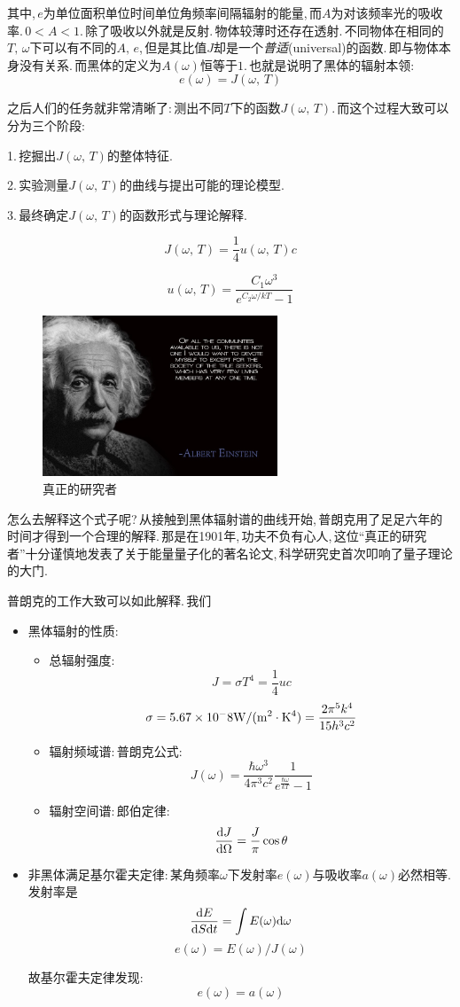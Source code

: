其中,\,$e$为单位面积单位时间单位角频率间隔辐射的能量,\,而$A$为对该频率光的吸收率.\,$0<A<1$.\,除了吸收以外就是反射.\,物体较薄时还存在透射.\,不同物体在相同的$T,\,\omega$下可以有不同的$A,\,e$,\,但是其比值$J$却是一个\emph{普适}(universal)的函数.\,即与物体本身没有关系.\,而黑体的定义为$A(\omega)$恒等于$1$.\,也就是说明了黑体的辐射本领:
\[e(\omega)=J(\omega,\,T)\]

之后人们的任务就非常清晰了:\,测出不同$T$下的函数$J(\omega,\,T)$.\,而这个过程大致可以分为三个阶段:

1.\,挖掘出$J(\omega,\,T)$的整体特征.

2.\,实验测量$J(\omega,\,T)$的曲线与提出可能的理论模型.

3.\,最终确定$J(\omega,\,T)$的函数形式与理论解释.

\[J(\omega,\,T)=\frac{1}{4}u(\omega,\,T)c\]

\[u(\omega,\,T)=\frac{C_1\omega^3}{e^{C_2\omega/kT}-1}\]

\begin{figure}
\centering
\vspace{-15pt}
\includegraphics[width=7cm]{image/19-1-2.jpg}
\caption{真正的研究者}
\end{figure}
怎么去解释这个式子呢?\,从接触到黑体辐射谱的曲线开始,\,普朗克用了足足六年的时间才得到一个合理的解释.\,那是在1901年,\,功夫不负有心人,\,这位``真正的研究者''十分谨慎地发表了关于能量量子化的著名论文,\,科学研究史首次叩响了量子理论的大门.

普朗克的工作大致可以如此解释.\,我们


\begin{itemize}
\item 黑体辐射的性质:
\begin{itemize}
\item 总辐射强度:
\[J=\sigma T^4=\frac{1}{4}uc\]
\[\sigma=5.67\times 10^-8{\rm W/(m^2\cdot K^4)}=\frac{2\pi^5 k^4}{15h^3c^2}\]

\item 辐射频域谱:\,普朗克公式:
\[J(\omega)=\frac{\hbar\omega^3}{4\pi^3c^2}\frac{1}{e^{\frac{\hbar\omega}{kT}}-1}\]

\item 辐射空间谱:\,郎伯定律:
\[\frac{\textrm{d} J}{\textrm{d}\Omega}=\frac{J}{\pi}\cos\theta\]
\end{itemize}

\item 非黑体满足基尔霍夫定律:\,某角频率$\omega$下发射率$e(\omega)$与吸收率$a(\omega)$必然相等.\,发射率是
\[\frac{\textrm{d} E}{\textrm{d} S\textrm{d} t}=\int E(\omega)\textrm{d} \omega\]
\[e(\omega)=E(\omega)/J(\omega)\]

故基尔霍夫定律发现:
\[e(\omega)=a(\omega)\]
\end{itemize}

